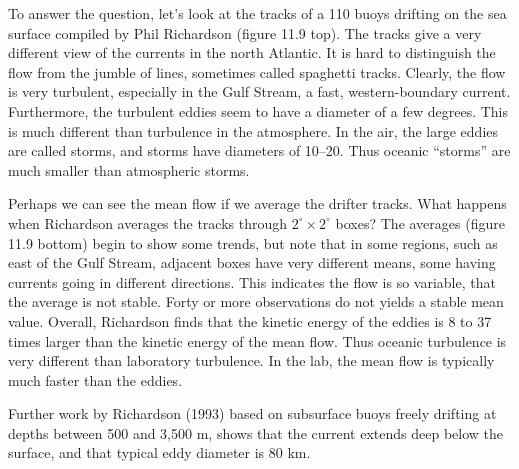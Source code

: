 To answer the question, let's look at the tracks of a 110 buoys
drifting on the sea surface compiled by Phil Richardson (figure 11.9
top). The tracks give a very different view of the currents in the
north Atlantic. It is hard to distinguish the flow from the jumble of
lines, sometimes called spaghetti tracks. Clearly, the flow is very
turbulent, especially in the Gulf Stream, a fast, western-boundary current. Furthermore, the
turbulent eddies seem to have a diameter of a few degrees. This is
much different than turbulence in the atmosphere. In
the air, the large eddies are called storms, and storms have diameters
of 10\degrees --20\degrees. Thus oceanic ``storms'' are much smaller
than atmospheric storms.

Perhaps we can see the mean flow if we average the drifter
tracks. What happens when Richardson averages the tracks through
$2^{\circ} \times 2^{\circ}$ boxes? The averages (figure 11.9 bottom)
begin to show some trends, but note that in some regions, such as east
of the Gulf Stream, adjacent boxes have very different means, some
having currents going in different directions. This indicates the flow
is so variable, that the average is not stable. Forty or more
observations do not yields a stable mean value. Overall, Richardson
finds that the kinetic energy of the eddies is 8 to 37 times larger
than the kinetic energy of the mean flow. Thus oceanic
turbulence is very different than laboratory
turbulence. In the lab, the mean flow is
typically much faster than the eddies.

Further work by Richardson (1993) based on subsurface buoys freely
drifting at depths between 500 and 3,500 m, shows that the current
extends deep below the surface, and that typical eddy diameter is 80
km.

